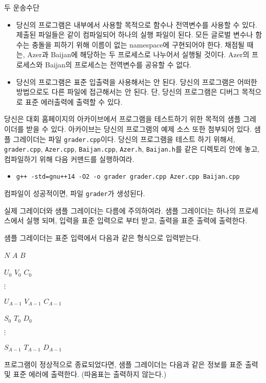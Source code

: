 \begin{problem}{두 운송수단}
	\Notes
	
	\begin{itemize}
		\item 당신의 프로그램은 내부에서 사용할 목적으로 함수나 전역변수를 사용할 수 있다. 제출된 파일들은 같이 컴파일되어 하나의 실행 파일이 된다. 모든 글로벌 변수나 함수는 충돌을 피하기 위해 이름이 없는 namespace에 구현되어야 한다. 채점될 때는, Azer과 Baijan에 해당하는 두 프로세스로 나누어서 실행될 것이다. Azer의 프로세스와 Baijan의 프로세스는 전역변수를 공유할 수 없다.
		\item 당신의 프로그램은 표준 입출력을 사용해서는 안 된다. 당신의 프로그램은 어떠한 방법으로도 다른 파일에 접근해서는 안 된다. 단, 당신의 프로그램은 디버그 목적으로 표준 에러출력에 출력할 수 있다.
	\end{itemize}
	
	당신은 대회 홈페이지의 아카이브에서 프로그램을 테스트하기 위한 목적의 샘플 그레이더를 받을 수 있다. 아카이브는 당신의 프로그램의 예제 소스 또한 첨부되어 있다.
	샘플 그레이더는 파일 \texttt{grader.cpp}이다. 당신의 프로그램을 테스트 하기 위해서, \texttt{grader.cpp}, \texttt{Azer.cpp}, \texttt{Baijan.cpp}, \texttt{Azer.h}, \texttt{Baijan.h}를 같은 디렉토리 안에 놓고, 컴파일하기 위해 다음 커맨드를 실행하여라.
	
	\begin{itemize}
		\item \texttt{g++ -std=gnu++14 -O2 -o grader grader.cpp Azer.cpp Baijan.cpp}
	\end{itemize}
	
	컴파일이 성공적이면, 파일 \texttt{grader}가 생성된다.
	
	실제 그레이더와 샘플 그레이더는 다름에 주의하여라. 샘플 그레이더는 하나의 프로세스에서 실행 되며, 입력을 표준 입력으로 부터 받고, 출력을 표준 출력에 출력한다.
	
	\InputFile
	
	샘플 그레이더는 표준 입력에서 다음과 같은 형식으로 입력받는다.
	
	$N$ $A$ $B$
	
	$U_0$ $V_0$ $C_0$
	
	$\vdots$
	
	$U_{A-1}$ $V_{A-1}$ $C_{A-1}$

	$S_0$ $T_0$ $D_0$

	$\vdots$
	
	$S_{A-1}$ $T_{A-1}$ $D_{A-1}$	
	
	\OutputFile
	
	프로그램이 정상적으로 종료되었다면, 샘플 그레이더는 다음과 같은 정보를 표준 출력 및 표준 에러에 출력한다. (따옴표는 출력하지 않는다.)
	

\end{problem}
